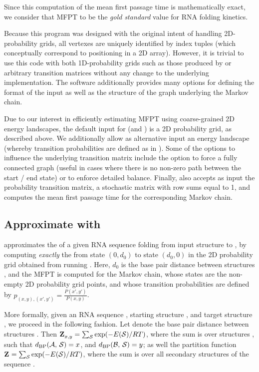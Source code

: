 Since this computation of the
mean first passage time is mathematically exact, we consider that MFPT
to be the {\em gold standard} value for RNA folding kinetics.

Because this program was designed with the original intent
of handling 2D-probability grids, all vertexes are uniquely identified
by index tuples (which conceptually correspond to positioning in a 2D
array). However, it is trivial to use this code with both
1D-probability grids such as those produced by \fftbor
\citep{Senter.po12} or arbitrary transition matrices without any change
to the underlying implementation. The software additionally provides
many options for defining the format of the input as well as the
structure of the graph underlying the
Markov chain.

Due to our interest in efficiently estimating MFPT using coarse-grained 2D
energy landscapes, the default input for \rnamfpt (and \rnaeq) is a 2D
probability grid, as described above. We additionally allow as alternative input
an energy landscape (whereby transition probabilities are defined as in
).
Some of the options to influence the underlying transition matrix
include the option to force a fully
connected graph (useful in cases where there is no non-zero path
between the start / end state) or to enforce detailed balance.
Finally, \rnamfpt also accepts as input the probability transition matrix,
a stochastic matrix with row sums equal to 1, and computes the mean
first passage time for the corresponding Markov chain.

\subsection{Approximate \mfpt with \fftmfpt}
\label{subsec:hermes:fftmfpt}

\fftmfpt approximates the \mfpt of a given RNA
sequence folding from input structure \strA to \strB, by
computing {\em exactly} the \mfpt from state $(0,d_0)$ to state
$(d_0,0)$ in the 2D probability grid obtained from running
\ffttwo. Here, $d_0$ is the base pair distance between structures
\strAB, and the MFPT is computed for the Markov chain, whose states are
the non-empty 2D probability grid points, and whose transition
probabilities are defined by $p_{(x,y),(x',y')} =
\frac{P(x',y')}{P(x,y)}$.

More formally, given an RNA sequence \seq, starting structure \strA, and
target structure \strB, we proceed in the following fashion. Let \dBP{\strA}{\strB} denote the base pair distance between structures
\strAB. Then ${\bf Z}^{}_{x,y} = \sum_\mathcal S \exp(-E(\mathcal S)/RT)$, where the sum is over
structures \str, such that $d_{\text{BP}}(\mathcal A,\,\mathcal S) = x$, and
$d_{\text{BP}}(\mathcal B,\,\mathcal S) = y$; as
well the partition function ${\bf Z}^{}_{} = \sum_\mathcal S \exp(-E(\mathcal S)/RT)$, where the sum
is over all secondary structures \str of the sequence \seq.

